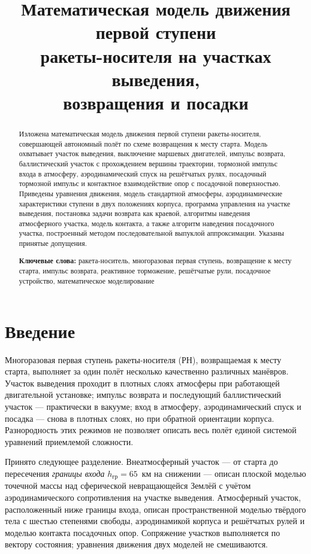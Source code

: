 \documentclass[11pt,a4paper]{article}
\title{Математическая модель движения первой ступени\\
ракеты-носителя на участках выведения,\\
возвращения и посадки}
\author{}
\date{}
\begin{document}
\maketitle
\vspace{-2.4cm}

\begin{abstract}
\noindent
Изложена математическая модель движения первой ступени ракеты-носителя,
совершающей автономный полёт по схеме возвращения к месту старта. Модель
охватывает участок выведения, выключение маршевых двигателей, импульс
возврата, баллистический участок с прохождением вершины траектории, тормозной
импульс входа в атмосферу, аэродинамический спуск на решётчатых рулях,
посадочный тормозной импульс и контактное взаимодействие опор с посадочной
поверхностью. Приведены уравнения движения, модель стандартной атмосферы,
аэродинамические характеристики ступени в двух положениях корпуса, программа
управления на участке выведения, постановка задачи возврата как краевой,
алгоритмы наведения атмосферного участка, модель контакта, а также
алгоритм наведения посадочного участка, построенный методом последовательной
выпуклой аппроксимации. Указаны принятые допущения.

\medskip\noindent
\textbf{Ключевые слова:} ракета-носитель, многоразовая первая ступень,
возвращение к месту старта, импульс возврата, реактивное торможение,
решётчатые рули, посадочное устройство, математическое моделирование
\end{abstract}

\tableofcontents

\section{Введение}

Многоразовая первая ступень ракеты-носителя (РН), возвращаемая к месту старта,
выполняет за один полёт несколько качественно различных манёвров. Участок
выведения проходит в плотных слоях атмосферы при работающей двигательной
установке; импульс возврата и последующий баллистический участок — практически
в вакууме; вход в атмосферу, аэродинамический спуск и посадка — снова в плотных
слоях, но при обратной ориентации корпуса. Разнородность этих режимов не
позволяет описать весь полёт единой системой уравнений приемлемой сложности.

Принято следующее разделение. Внеатмосферный участок — от старта до пересечения
\emph{границы входа} $h_{\text{гр}}=65$~км на снижении — описан плоской моделью
точечной массы над сферической невращающейся Землёй с учётом аэродинамического
сопротивления на участке выведения. Атмосферный участок, расположенный ниже
границы входа, описан пространственной моделью твёрдого тела с шестью степенями
свободы, аэродинамикой корпуса и решётчатых рулей и моделью контакта посадочных
опор. Сопряжение участков выполняется по вектору состояния; уравнения движения
двух моделей не смешиваются.
\end{document}
